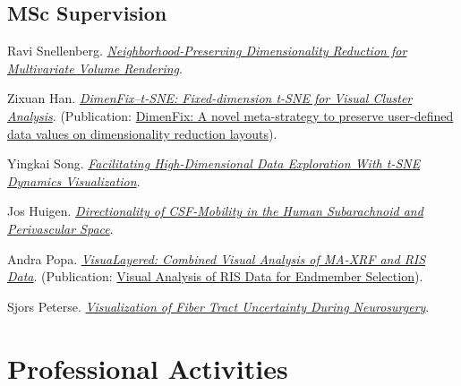 \documentclass[10pt,a4paper,roman,final]{moderncv}
\begin{document}
\subsection*{MSc Supervision}
\begin{description}[style=multiline,leftmargin=2.0cm,font=\normalfont]
\item[2025] Ravi Snellenberg. \href{https://repository.tudelft.nl/record/uuid:91d45452-416f-4fda-bfb5-261be169f958}{\emph{Neighborhood-Preserving Dimensionality Reduction for Multivariate Volume Rendering}}.
\item[2025] Zixuan Han. \href{https://repository.tudelft.nl/record/uuid:238ea14c-cbc6-4543-b717-b0c83245c275}{\emph{DimenFix–t-SNE: Fixed-dimension t-SNE for Visual Cluster Analysis}}. (Publication: \href{https://www.thomashollt.com/publications/2025_dimenfix/}{DimenFix: A novel meta-strategy to preserve user-defined data values on dimensionality reduction layouts}).
\item[2025] Yingkai Song. \href{https://repository.tudelft.nl/record/uuid:e2a9f063-bc3f-47ad-a069-11d602c39df0}{\emph{Facilitating High-Dimensional Data Exploration With t-SNE Dynamics Visualization}}.
\item[2023] Jos Huigen. \href{https://repository.tudelft.nl/record/uuid:a04dd2f0-3683-42d5-95a2-3dcdbc1983e1}{\emph{Directionality of CSF-Mobility in the Human Subarachnoid and Perivascular Space}}.
\item[2022] Andra Popa. \href{https://repository.tudelft.nl/record/uuid:20fb119e-ccb7-431c-8335-0fd5cf9f4ead}{\emph{VisuaLayered: Combined Visual Analysis of MA-XRF and RIS Data}}. (Publication: \href{https://www.thomashollt.com/publications/2022_gch_andra/}{Visual Analysis of RIS Data for Endmember Selection}).
\item[2022] Sjors Peterse. \href{https://repository.tudelft.nl/record/uuid:868639eb-e394-456f-822f-7da6ce0bbb5e}{\emph{Visualization of Fiber Tract Uncertainty During Neurosurgery}}.
\end{description}


\section*{Professional Activities}
\end{document}
